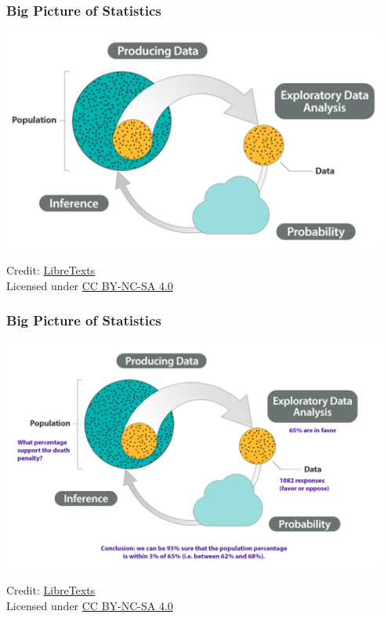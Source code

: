\documentclass[slidestop,compress,mathserif]{beamer}
\begin{document}
\begin{frame}
    \frametitle{Big Picture of Statistics}
    \begin{center}
        \includegraphics[width=0.95\textwidth]{BigPicture1.png}
    \end{center}
    \vspace{0.5em}
    \footnotesize
    Credit: \href{https://stats.libretexts.org/Bookshelves/Applied_Statistics/Biostatistics_-_Open_Learning_Textbook/Preliminaries/The_Big_Picture}{LibreTexts}
    \\
    Licensed under \href{https://creativecommons.org/licenses/by-nc-sa/4.0/}{CC BY-NC-SA 4.0}
\end{frame}

\begin{frame}
    \frametitle{Big Picture of Statistics}
    \begin{center}
        \includegraphics[width=0.95\textwidth]{BigPicture2.png}
    \end{center}
    \vspace{0.5em}
    \footnotesize
    Credit: \href{https://stats.libretexts.org/Bookshelves/Applied_Statistics/Biostatistics_-_Open_Learning_Textbook/Preliminaries/The_Big_Picture}{LibreTexts}
    \\
    Licensed under \href{https://creativecommons.org/licenses/by-nc-sa/4.0/}{CC BY-NC-SA 4.0}
\end{frame}
\end{document}
